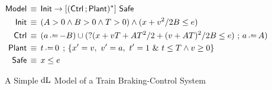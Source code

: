 \begin{figure}
  \begin{center}
    \begin{align}
      \JSCModel &\Equiv \Init \limplyI \lbox{(\Ctrl \seqI \Plant)^*}{\Safe} \label{eq:example-model-def} \\
      \Init &\Equiv (A>0 \land B>0 \land T>0) \land (x + v^2/2B \le e) \nonumber \\
      \Ctrl &\Equiv (a \dlassign -B) \cup (?(x + vT + AT^2/2 + (v+AT)^2/2B \le e) \seq a \dlassign A) \label{eq:example-model-ctrl} \\
      \Plant &\Equiv t \dlassign 0 \;\,;\, \{ x'=v \commasep v'=a \commasep t'=1 \dldom t \le T \land v \ge 0 \} \nonumber \\
      \Safe &\Equiv  x \le e \nonumber
    \end{align}
  \end{center}
  \vspace{-0.2cm}
  \caption{A Simple $\mathop{}\!\mathrm{d} \text{L}$ Model of a Train Braking-Control System~\cite{DBLP:conf/hybrid/PlatzerQ08}}\label{fig:overview-etcs}
  \Description[]{}
\end{figure}
